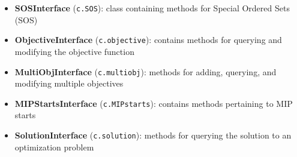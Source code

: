\documentclass[12pt]{article}
\begin{document}
\begin{itemize}
    \item \textbf{SOSInterface} (\texttt{c.SOS}): class containing methods for Special Ordered Sets (SOS)
    \item \textbf{ObjectiveInterface} (\texttt{c.objective}): contains methods for querying and modifying the objective function
    \item \textbf{MultiObjInterface} (\texttt{c.multiobj}): methods for adding, querying, and modifying multiple objectives
    \item \textbf{MIPStartsInterface} (\texttt{c.MIP\ttul starts}): contains methods pertaining to MIP starts
    \item \textbf{SolutionInterface} (\texttt{c.solution}): methods for querying the solution to an optimization problem
        \begin{itemize}

\end{itemize}
\end{itemize}
\end{document}
